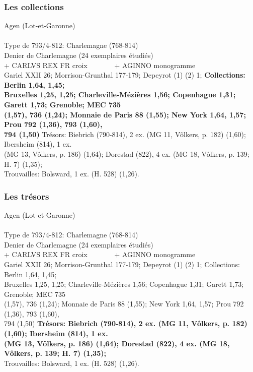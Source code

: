 \documentclass[10pt, compress]{beamer}
\begin{document}
\begin{frame}[fragile]
  \frametitle{Les collections}
  \begin{scriptsize}
\textcolor{light_gray}{Agen (Lot-et-Garonne)}\\~\\

\textcolor{light_gray}{
Type de 793/4-812: Charlemagne (768-814)\\
Denier de Charlemagne (24 exemplaires étudiés)\\
+ CARLVS REX FR croix~~~~~~~ + AGINNO monogramme
}\\
\textcolor{light_gray}{
Gariel XXII 26; Morrison-Grunthal 177-179; Depeyrot (1) (2) 1; }\textbf{Collections: Berlin 1,64, 1,45; \\
Bruxelles 1,25, 1,25; Charleville-Mézières 1,56; Copenhague 1,31; Garett 1,73; Grenoble; MEC 735 \\
(1,57), 736 (1,24); Monnaie de Paris 88 (1,55); New York 1,64, 1,57; Prou 792 (1,36), 793 (1,60), \\
794 (1,50) }\textcolor{light_gray}{Trésors: Biebrich (790-814), 2 ex. (MG 11, Vôlkers, p. 182) (1,60); Ibersheim (814), 1 ex. \\(MG 13, Vôlkers, p. 186) (1,64); Dorestad (822), 4 ex. (MG 18, Vôlkers, p. 139; H. 7) (1,35); \\Trouvailles: Bolsward, 1 ex. (H. 528) (1,26).
} 
    \end{scriptsize}
\end{frame}

\begin{frame}[fragile]
  \frametitle{Les trésors}
  \begin{scriptsize}
\textcolor{light_gray}{Agen (Lot-et-Garonne)}\\~\\

\textcolor{light_gray}{
Type de 793/4-812: Charlemagne (768-814)\\
Denier de Charlemagne (24 exemplaires étudiés)\\
+ CARLVS REX FR croix~~~~~~~ + AGINNO monogramme
}\\
\textcolor{light_gray}{
Gariel XXII 26; Morrison-Grunthal 177-179; Depeyrot (1) (2) 1;
Collections: Berlin 1,64, 1,45; \\
Bruxelles 1,25, 1,25; Charleville-Mézières 1,56; Copenhague 1,31; Garett 1,73; Grenoble; MEC 735 \\
(1,57), 736 (1,24); Monnaie de Paris 88 (1,55); New York 1,64, 1,57; Prou 792 (1,36), 793 (1,60), \\
794 (1,50) }\textbf{Trésors: Biebrich (790-814), 2 ex. (MG 11, Vôlkers, p. 182) (1,60); Ibersheim (814), 1 ex. \\
(MG 13, Vôlkers, p. 186) (1,64); Dorestad (822), 4 ex. (MG 18, Vôlkers, p. 139; H. 7) (1,35); }\\
\textcolor{light_gray}{
Trouvailles: Bolsward, 1 ex. (H. 528) (1,26).
} 
    \end{scriptsize}
\end{frame}
\end{document}

